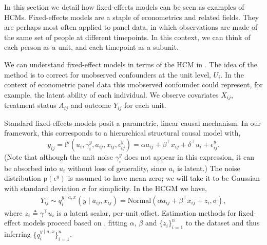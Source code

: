 \documentclass[12pt]{article}
\newcommand{\pr}{\mathrm{p}}
\newcommand{\f}{\mathrm{f}}
\begin{document}
In this section we detail how fixed-effects models can be seen as examples of HCMs.
Fixed-effects models are a staple of econometrics and related fields.
They are perhaps most often applied to panel data, in which observations are made of the same set of people at different timepoints. 
In this context, we can think of each person as a unit, and each timepoint as a subunit.

We can understand fixed-effect models in terms of the HCM in .
The idea of the method is to correct for unobserved confounders at the unit level, $U_i$.
In the context of econometric panel data this unobserved confounder could represent, for example, the latent ability of each individual.
We observe covariates $X_{ij}$, treatment status $A_{ij}$ and outcome $Y_{ij}$ for each unit.

Standard fixed-effects models posit a parametric, linear causal mechanism.
In our framework, this corresponds to a hierarchical structural causal model with,
\begin{equation}
	y_{ij} = \f^y(u_i, \gamma^y_i, a_{ij}, x_{ij}, \epsilon_{ij}^y) = \alpha a_{ij} + \beta^\top x_{ij} + \delta^\top u_i + \epsilon_{ij}^y.
\end{equation}
(Note that although the unit noise $\gamma^y_i$ does not appear in this expression, it can be absorbed into $u_i$ without loss of generality, since $u_i$ is latent.)  
The noise distribution $\pr(\epsilon^y)$ is assumed to have mean zero; we will take it to be Gaussian with standard deviation $\sigma$ for simplicity. 
In the HCGM we have, 
\begin{equation} \label{eqn:fixed_effects_hcgm}
\begin{split}
	Y_{ij} \sim q^{y \mid a, x}_i(y \mid a_{ij}, x_{ij}) = \mathrm{Normal}(\alpha a_{ij} + \beta^\top x_{ij} + z_i, \sigma),
\end{split}
\end{equation}
where $z_i \triangleq \gamma^\top u_i$ is a latent scalar, per-unit offset. 
Estimation methods for fixed-effect models proceed based on , fitting $\alpha$, $\beta$ and $\{z_i\}_{i=1}^n$ to the dataset and thus inferring $\{q^{y \mid a, x}_i\}_{i=1}^n$.
\end{document}
